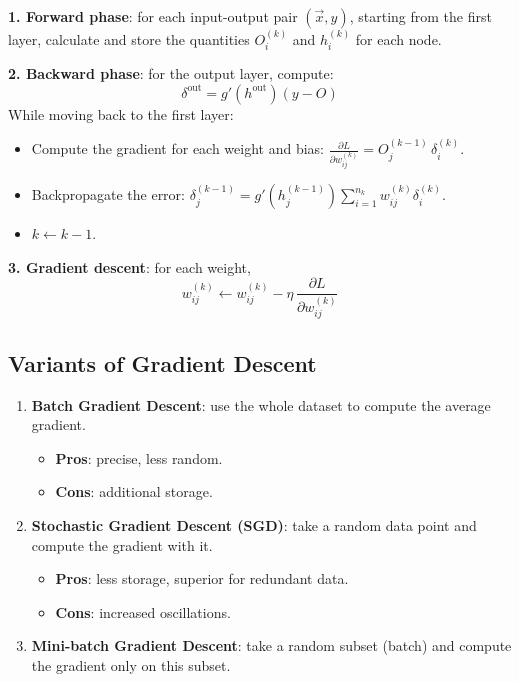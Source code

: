 \documentclass[11pt,a4paper]{article}
\newcommand{\vx}{\vec{x}}
\begin{document}
\begin{tcolorbox}[colback=boxgray, colframe=leidenblue, title=\textbf{Backpropagation Algorithm}]
\textbf{1. Forward phase}: for each input-output pair $(\vx, y)$, starting from the first layer, calculate and store the quantities $O_i^{(k)}$ and $h_i^{(k)}$ for each node.

\smallskip
\textbf{2. Backward phase}: for the output layer, compute:
\[
\delta^{\text{out}} = g'(h^{\text{out}})(y - O)
\]
While moving back to the first layer:
\begin{itemize}[leftmargin=*]
    \item Compute the gradient for each weight and bias:
    $\frac{\partial L}{\partial w_{ij}^{(k)}} = O_j^{(k-1)}\,\delta_i^{(k)}$.
    \item Backpropagate the error: $\delta_j^{(k-1)} = g'(h_j^{(k-1)})\sum_{i=1}^{n_k} w_{ij}^{(k)}\delta_i^{(k)}$.
    \item $k \leftarrow k - 1$.
\end{itemize}

\smallskip
\textbf{3. Gradient descent}: for each weight,
\[
w_{ij}^{(k)} \leftarrow w_{ij}^{(k)} - \eta\,\frac{\partial L}{\partial w_{ij}^{(k)}}
\]
\end{tcolorbox}

\subsection{Variants of Gradient Descent}

\begin{enumerate}[leftmargin=*]
    \item \textbf{Batch Gradient Descent}: use the whole dataset to compute the average gradient.
    \begin{itemize}
        \item \textbf{Pros}: precise, less random.
        \item \textbf{Cons}: additional storage.
    \end{itemize}
    \item \textbf{Stochastic Gradient Descent (SGD)}: take a random data point and compute the gradient with it.
    \begin{itemize}
        \item \textbf{Pros}: less storage, superior for redundant data.
        \item \textbf{Cons}: increased oscillations.
    \end{itemize}
    \item \textbf{Mini-batch Gradient Descent}: take a random subset (batch) and compute the gradient only on this subset.
\end{enumerate}
\end{document}

